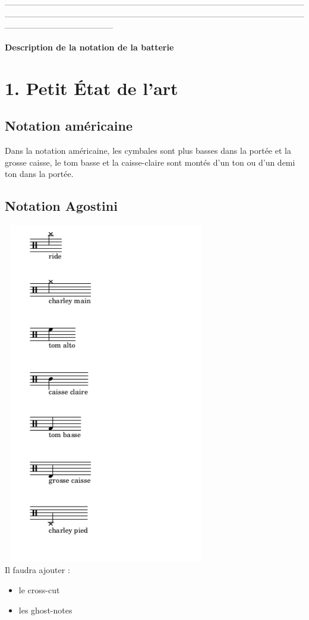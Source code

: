 —————————————————————————————————————————————————————————————————————————————————————\\
\begin{center}
	\textbf{\LARGE{Description de la notation de la batterie}}
\end{center}
\section*{1. Petit État de l’art}
\subsection*{Notation américaine}
Dans la notation américaine, les cymbales sont plus basses dans la portée et la grosse caisse, le tom basse et la caisse-claire sont montés d’un ton ou d’un demi ton dans la portée.
\subsection*{Notation Agostini}
\includegraphics[height=150mm, width=90mm]{images/description_notation_0.png}\\
Il faudra ajouter :
\begin{itemize}
	\item le cross-cut
	\item les ghost-notes
\end{itemize}
